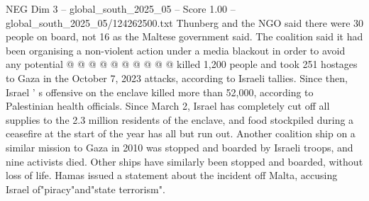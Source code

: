 \begin{textsample}{NEG Dim 3 – global\_south\_2025\_05 – Score 1.00 – global\_south\_2025\_05/124262500.txt}
Thunberg and the NGO said there were 30 people on board, not 16 as the Maltese government said.
The coalition said it had been organising a non-violent action under a media blackout in order to avoid any potential @ @ @ @ @ @ @ @ @ @ killed 1,200 people and took 251 hostages to Gaza in the October 7, 2023 attacks, according to Israeli tallies.
Since then, Israel ' s offensive on the enclave killed more than 52,000, according to Palestinian health officials.
Since March 2, Israel has completely cut off all supplies to the 2.3 million residents of the enclave, and food stockpiled during a ceasefire at the start of the year has all but run out.
Another coalition ship on a similar mission to Gaza in 2010 was stopped and boarded by Israeli troops, and nine activists died.
Other ships have similarly been stopped and boarded, without loss of life.
Hamas issued a statement about the incident off Malta, accusing Israel of"piracy"and"state terrorism".

\end{textsample}
